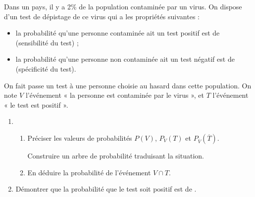 \documentclass[a4paper,12pt,french]{article}
\begin{document}
\begin{Exercise}[number=2,title={5 points}]
  Dans un pays, il y a 2\% de la population contaminée par un virus. On
  dispose d'un test de dépistage de ce virus qui a les propriétés
  suivantes :
  \begin{itemize}[label=--]
    \item la probabilité qu'une personne contaminée ait un test positif
      est de  (sensibilité du test) ;
    \item la probabilité qu'une personne non contaminée ait un test
      négatif est de  (spécificité du test).
  \end{itemize}
  On fait passe un test à une personne choisie au hasard dans cette
  population. On note $V$ l'événement « la personne est contaminée par
  le virus », et  $T$ l'événement « le test est positif  ».

  \begin{enumerate}
    \item \begin{enumerate}
        \item Préciser les valeurs de probabilités $P(V)$, $P_V(T)$ et
          $P_{\overline{V}}(\overline{T})$.

          Construire un arbre de probabilité traduisant la situation.
        \item En déduire la probabilité de l'événement $V\cap T$.
      \end{enumerate}
    \item Démontrer que la probabilité que le test soit positif est de
      .
  \end{enumerate}
\end{Exercise}
\pagebreak
\end{document}

